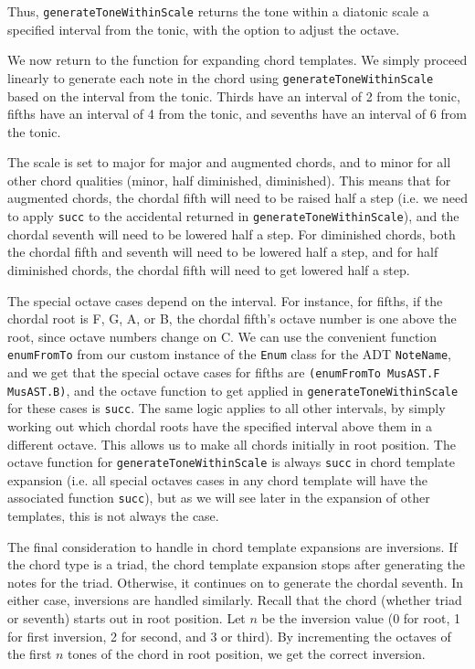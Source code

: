 \documentclass{report}
\begin{document}
Thus, \verb.generateToneWithinScale. returns the tone within a diatonic scale a specified interval from the tonic, with the option to adjust the octave.

We now return to the function for expanding chord templates. We simply proceed linearly to generate each note in  the chord using \verb.generateToneWithinScale. based on the interval from the tonic. Thirds have an interval of 2 from the tonic, fifths have an interval of 4 from the tonic, and sevenths have an interval of 6 from the tonic.

The scale is set to major for major and augmented chords, and to minor for all other chord qualities (minor, half diminished, diminished). This means that for augmented chords, the chordal fifth will need to be raised half a step (i.e. we need to apply \verb.succ. to the accidental returned in \verb.generateToneWithinScale.), and the chordal seventh will need to be lowered half a step. For diminished chords, both the chordal fifth and seventh will need to be lowered half a step, and for half diminished chords, the chordal fifth will need to get lowered half a step. 

The special octave cases depend on the interval. For instance, for fifths, if the chordal root is F, G, A, or B, the chordal fifth's octave number is one above the root, since octave numbers change on C. We can use the convenient function \verb.enumFromTo. from our custom instance of the \verb.Enum. class for the ADT \verb.NoteName., and we get that the special octave cases for fifths are \verb!(enumFromTo MusAST.F MusAST.B)!, and the octave function to get applied in \verb.generateToneWithinScale. for these cases is \verb.succ.. The same logic applies to all other intervals, by simply working out which chordal roots have the specified interval above them in a different octave. This allows us to make all chords initially in root position. The octave function for \verb.generateToneWithinScale. is always \verb.succ. in chord template expansion (i.e. all special octaves cases in any chord template will have the associated function \verb.succ.), but as we will see later in the expansion of other templates, this is not always the case. 

The final consideration to handle in chord template expansions are inversions. If the chord type is a triad, the chord template expansion stops after generating the notes for the triad. Otherwise, it continues on to generate the chordal seventh. In either case, inversions are handled similarly. Recall that the chord (whether triad or seventh) starts out in root position. Let $n$ be the inversion value (0 for root, 1 for first inversion, 2 for second,  and 3 or third). By incrementing the octaves of the first $n$ tones of the chord in root position, we get the correct inversion. 
\end{document}
